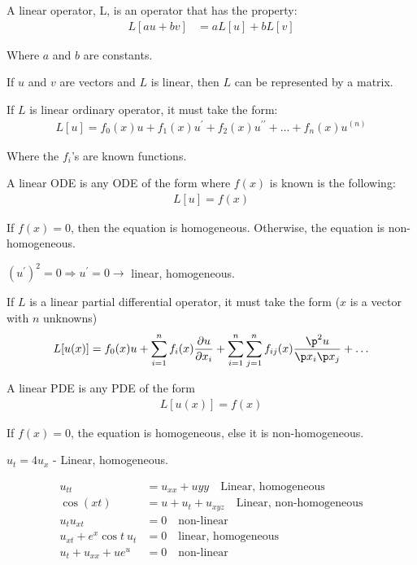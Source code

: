 \dfn A linear operator, L, is an operator that has the property:
%
\begin{align}
  L[au + bv] & = aL[u] + bL[v]
\end{align}

Where $a$ and $b$ are constants.

\thm If $u$ and $v$ are vectors and $L$ is linear, then $L$ can be represented by a matrix.

\thm If $L$ is linear ordinary operator, it must take the form:
%
\begin{align}
  L[u] = f_0(x)u + f_1(x)u^\prime + f_2(x)u^{\prime\prime} + \ldots + f_n(x)u^{(n)}
\end{align}

Where the $f_i$'s are known functions.

\dfn A linear ODE is any ODE of the form where $f(x)$ is known is the following:
%
\begin{align}
  L[u] = f(x)
\end{align}

If $f(x) = 0$, then the equation is homogeneous. Otherwise, the equation is non-homogeneous.

\ex $(u^\prime)^2 = 0 \Rightarrow u^\prime = 0 \rightarrow$ linear, homogeneous.

\thm If $L$ is a linear partial differential operator, it must take the form ($x$ is a vector with $n$ unknowns)
%
\begin{align}
  L[u(x)] = f_0(x)u + \sum^n_{i = 1} f_i(x) \frac{\partial u}{\partial x_i} +
  \sum^n_{i = 1} \sum^n_{j = 1} f_{ij}(x) \frac{\p^2 u}{\p x_i \p x_j} + \ldots
\end{align}

\dfn A linear PDE is any PDE of the form
%
\begin{align}
  L[u(x)] = f(x)
\end{align}

If $f(x) = 0$, the equation is homogeneous, else it is non-homogeneous.

\ex $u_t = 4u_x$ - Linear, homogeneous.

\bigbreak
{}

\Ex
%
\begin{align}
  u_{tt} & = u_{xx} + u{yy}\quad \text{Linear, homogeneous}\\
  \cos{(xt)} & = u + u_t + u_{xyz}\quad \text{Linear, non-homogeneous}\\
  u_tu_{xt} & = 0\quad \text{non-linear}\\
  u_{xt} + e^x \cos t\ u_t & = 0\quad \text{linear, homogeneous}\\
  u_t + u_{xx} + ue^u & = 0\quad \text{non-linear}
\end{align}

